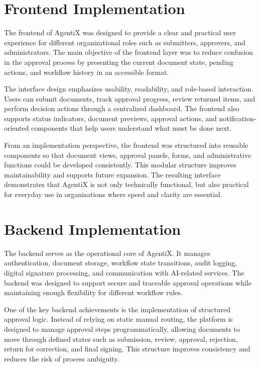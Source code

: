 \documentclass[12pt,oneside,openright,a4paper]{cpe-english-project}
\begin{document}
\section{Frontend Implementation}

The frontend of AgentiX was designed to provide a clear and practical user experience for different organizational roles such as submitters, approvers, and administrators. The main objective of the frontend layer was to reduce confusion in the approval process by presenting the current document state, pending actions, and workflow history in an accessible format.

The interface design emphasizes usability, readability, and role-based interaction. Users can submit documents, track approval progress, review returned items, and perform decision actions through a centralized dashboard. The frontend also supports status indicators, document previews, approval actions, and notification-oriented components that help users understand what must be done next.

From an implementation perspective, the frontend was structured into reusable components so that document views, approval panels, forms, and administrative functions could be developed consistently. This modular structure improves maintainability and supports future expansion. The resulting interface demonstrates that AgentiX is not only technically functional, but also practical for everyday use in organizations where speed and clarity are essential.

\section{Backend Implementation}

The backend serves as the operational core of AgentiX. It manages authentication, document storage, workflow state transitions, audit logging, digital signature processing, and communication with AI-related services. The backend was designed to support secure and traceable approval operations while maintaining enough flexibility for different workflow rules.

One of the key backend achievements is the implementation of structured approval logic. Instead of relying on static manual routing, the platform is designed to manage approval steps programmatically, allowing documents to move through defined states such as submission, review, approval, rejection, return for correction, and final signing. This structure improves consistency and reduces the risk of process ambiguity.
\end{document}
